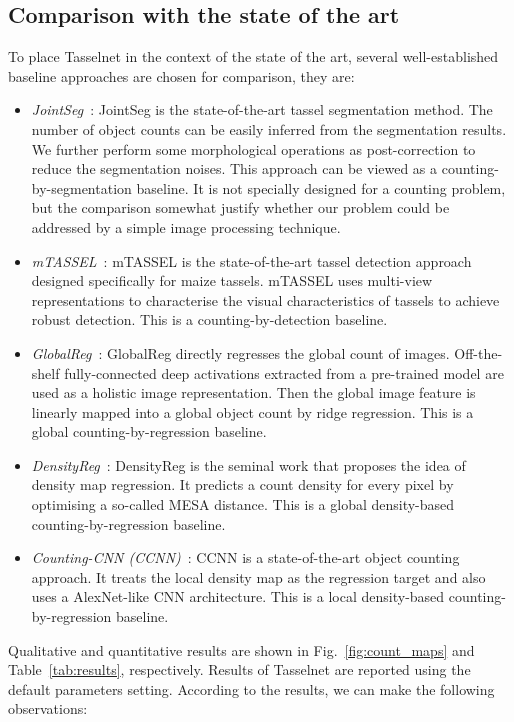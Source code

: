\documentclass[twocolumn]{bmcart}%
\begin{document}
\subsection*{Comparison with the state of the art}
To place Tasselnet in the context of the state of the art, several well-established baseline approaches are chosen for comparison, they are:
\begin{itemize}
	\item \textit{JointSeg}~\cite{lu2016region}: JointSeg is the state-of-the-art tassel segmentation method. The number of object counts can be easily inferred from the segmentation results. We further perform some morphological operations as post-correction to reduce the segmentation noises. This approach can be viewed as a counting-by-segmentation baseline. It is not specially designed for a counting problem, but the comparison somewhat justify whether our problem could be addressed by a simple image processing technique.
	\item \textit{mTASSEL}~\cite{lu2015fine}: mTASSEL is the state-of-the-art tassel detection approach designed specifically for maize tassels. mTASSEL uses multi-view representations to characterise the visual characteristics of tassels to achieve robust detection. This is a counting-by-detection baseline.
	\item \textit{GlobalReg}~\cite{tota2015counting}: GlobalReg directly regresses the global count of images. Off-the-shelf fully-connected deep activations extracted from a pre-trained model are used as a holistic image representation. Then the global image feature is linearly mapped into a global object count by ridge regression. This is a global counting-by-regression baseline.
	\item \textit{DensityReg}~\cite{vlaz2010denlearn}: DensityReg is the seminal work that proposes the idea of density map regression. It predicts a count density for every pixel by optimising a so-called MESA distance. This is a global density-based counting-by-regression baseline.
	\item \textit{Counting-CNN (CCNN)}~\cite{onoro2016towards}: CCNN is a state-of-the-art object counting approach. It treats the local density map as the regression target and also uses a AlexNet-like CNN architecture. This is a local density-based counting-by-regression baseline.
\end{itemize}
Qualitative and quantitative results are shown in Fig.~\ref{fig:count_maps} and Table~\ref{tab:results}, respectively. Results of Tasselnet are reported using the default parameters setting. According to the results, we can make the following observations:
\end{document}
